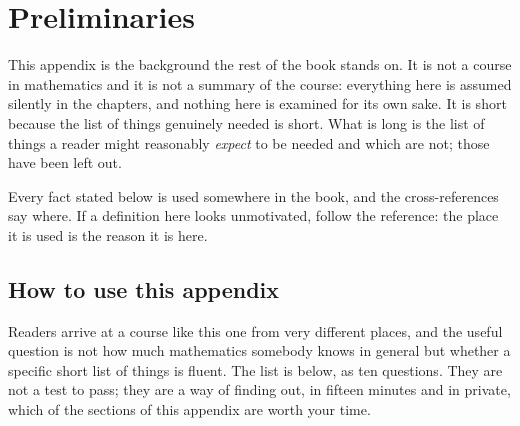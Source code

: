 
\chapter{Preliminaries}
\label{app:preliminaries}

This appendix is the background the rest of the book stands on. It is not a
course in mathematics and it is not a summary of the course: everything here is
assumed silently in the chapters, and nothing here is examined for its own
sake. It is short because the list of things genuinely needed is short. What is
long is the list of things a reader might reasonably \emph{expect} to be needed
and which are not; those have been left out.

Every fact stated below is used somewhere in the book, and the cross-references
say where. If a definition here looks unmotivated, follow the reference: the
place it is used is the reason it is here.

\section{How to use this appendix}
\label{sec:prelim-how-to-use}

Readers arrive at a course like this one from very different places, and the
useful question is not how much mathematics somebody knows in general but
whether a specific short list of things is fluent. The list is below, as ten
questions. They are not a test to pass; they are a way of finding out, in
fifteen minutes and in private, which of the sections of this appendix are
worth your time.

